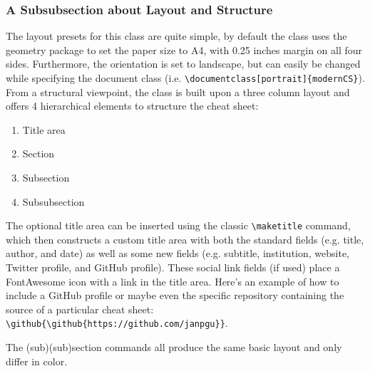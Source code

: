 \documentclass{modernCS}
\begin{document}
\subsubsection{A Subsubsection about Layout and Structure}
The layout presets for this class are quite simple, by default the class uses the geometry package to set the paper size to A4, with 0.25 inches margin on all four sides. Furthermore, the orientation is set to landscape, but can easily be changed while specifying the document class (i.e. \verb|\documentclass[portrait]{modernCS}|). From a structural viewpoint, the class is built upon a three column layout and offers 4 hierarchical elements to structure the cheat sheet:
\begin{enumerate}
	\item Title area
	\item Section
	\item Subsection
	\item Subsubsection
\end{enumerate}
The optional title area can be inserted using the classic \verb|\maketitle| command, which then constructs a custom title area with both the standard fields (e.g. title, author, and date) as well as some new fields (e.g. subtitle, institution, website, Twitter profile, and GitHub profile). These social link fields (if used) place a FontAwesome icon with a link in the title area. Here's an example of how to include a GitHub profile or maybe even the specific repository containing the source of a particular cheat sheet: \verb|\github{\github{https://github.com/janpgu}}|. \par
The (sub)(sub)section commands all produce the same basic layout and only differ in color.
\end{document}
